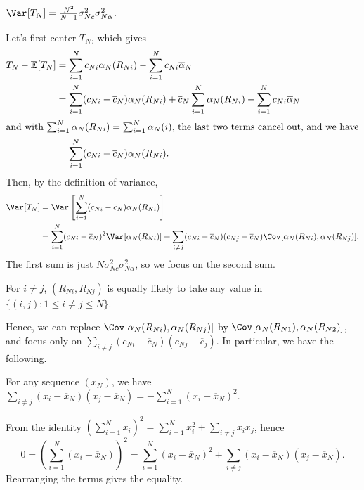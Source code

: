 \begin{claim}
	\(\Var_{}[T_N] = \frac{N^2}{N-1} \sigma _{Nc}^2 \sigma _{N \alpha }^2\).
\end{claim}
\begin{explanation}
	Let's first center \(T_N\), which gives
	\begin{align*}
		T_N - \mathbb{E}_{}[T_N]
		 & = \sum_{i=1}^{N} c_{Ni} \alpha _N(R_{Ni}) - \sum_{i=1}^{N} c_{Ni} \overline{\alpha} _N                                                                        \\
		 & = \sum_{i=1}^{N} (c_{Ni} - \overline{c} _N) \alpha _N(R_{Ni}) + \overline{c} _N \sum_{i=1}^{N} \alpha _N(R_{Ni}) - \sum_{i=1}^{N} c_{Ni} \overline{\alpha} _N \\
		\shortintertext{and with \(\sum_{i=1}^{N} \alpha _N(R_{Ni}) = \sum_{i=1}^{N} \alpha _N(i)\), the last two terms cancel out, and we have}
		 & = \sum_{i=1}^{N} (c_{Ni} - \overline{c} _N) \alpha _N(R_{Ni}).
	\end{align*}
	Then, by the definition of variance,
	\[
		\begin{split}
			\Var_{}[T_N]
			 & = \Var_{}\left[\sum_{i=1}^{N} (c_{Ni} - \overline{c} _N) \alpha _N(R_{Ni})\right]                                                                                                               \\
			 & = \sum_{i=1}^{N} (c_{Ni} - \overline{c} _N)^2 \Var_{}[\alpha _N(R_{Ni})] + \sum_{i \neq j} (c_{Ni} - \overline{c} _N)(c_{Nj} - \overline{c} _N) \Cov_{}[\alpha _N(R_{Ni}) , \alpha _N(R_{Nj})].
		\end{split}
	\]
	The first sum is just \(N \sigma _{Nc}^2 \sigma _{N \alpha }^2\), so we focus on the second sum.

	\begin{intuition}
		For \(i \neq j\), \((R_{Ni}, R_{Nj})\) is equally likely to take any value in \(\{ (i, j) \colon 1 \leq i \neq j \leq N\}\).
	\end{intuition}

	Hence, we can replace \(\Cov_{}[\alpha _N(R_{Ni}), \alpha _N(R_{Nj})] \) by \(\Cov_{}[\alpha _N(R_{N1}), \alpha _N(R_{N2})]\), and focus only on \(\sum_{i \neq j} (c_{Ni} - \overline{c} _N)(c_{Nj}- \overline{c} _j)\). In particular, we have the following.

	\begin{note}
		For any sequence \((x_N)\), we have \(\sum_{i \neq j} (x_i - \overline{x} _N)(x_j - \overline{x} _N) = - \sum_{i=1}^{N} (x_i - \overline{x} _N)^2\).
	\end{note}
	\begin{explanation}
		From the identity \(( \sum_{i=1}^{N} x_i ) ^2 = \sum_{i=1}^{N} x_i^2 + \sum_{i \neq j} x_i x_j \), hence
		\[
			0
			= \left( \sum_{i=1}^{N} (x_i - \overline{x} _N) \right) ^2
			= \sum_{i=1}^{N} (x_i - \overline{x} _N)^2 + \sum_{i \neq j} (x_i - \overline{x} _N)(x_j - \overline{x} _N).
		\]
		Rearranging the terms gives the equality.
	\end{explanation}


\end{explanation}
